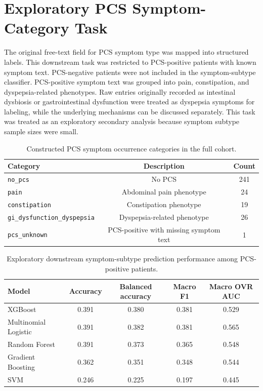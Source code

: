 \documentclass[11pt]{article}
\begin{document}
\begin{table}[H]
\centering
\caption{Exploratory PCS onset summary by predicted risk group.}
\label{tab:onset}
\small
\resizebox{\textwidth}{!}{\TableOnsetExploration}
\end{table}

\section{Exploratory PCS Symptom-Category Task}

The original free-text field for PCS symptom type was mapped into structured labels. This downstream task was restricted to PCS-positive patients with known symptom text. PCS-negative patients were not included in the symptom-subtype classifier. PCS-positive symptom text was grouped into pain, constipation, and dyspepsia-related phenotypes. Raw entries originally recorded as intestinal dysbiosis or gastrointestinal dysfunction were treated as dyspepsia symptoms for labeling, while the underlying mechanisms can be discussed separately. This task was treated as an exploratory secondary analysis because symptom subtype sample sizes were small.

\begin{table}[H]
\centering
\caption{Constructed PCS symptom occurrence categories in the full cohort.}
\label{tab:symptom_classes}
\small
\begin{tabular}{lcc}
\toprule
Category & Description & Count \\
\midrule
\texttt{no\_pcs} & No PCS & 241 \\
\texttt{pain} & Abdominal pain phenotype & 24 \\
\texttt{constipation} & Constipation phenotype & 19 \\
\texttt{gi\_dysfunction\_dyspepsia} & Dyspepsia-related phenotype & 26 \\
\texttt{pcs\_unknown} & PCS-positive with missing symptom text & 1 \\
\bottomrule
\end{tabular}
\end{table}

\begin{table}[H]
\centering
\caption{Exploratory downstream symptom-subtype prediction performance among PCS-positive patients.}
\label{tab:symptom_model_performance}
\small
\begin{tabular}{lcccc}
\toprule
Model & Accuracy & Balanced accuracy & Macro F1 & Macro OVR AUC \\
\midrule
XGBoost & 0.391 & 0.380 & 0.381 & 0.529 \\
Multinomial Logistic & 0.391 & 0.382 & 0.381 & 0.565 \\
Random Forest & 0.391 & 0.373 & 0.365 & 0.548 \\
Gradient Boosting & 0.362 & 0.351 & 0.348 & 0.544 \\
SVM & 0.246 & 0.225 & 0.197 & 0.445 \\
\bottomrule
\end{tabular}
\end{table}
\end{document}
